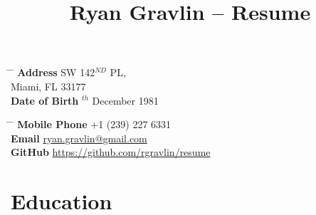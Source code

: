 \documentclass[10pt]{article} %
\begin{document}

\title{Ryan Gravlin -- Resume} %


\parbox{0.5\textwidth}{ %
\begin{tabbing} %
\hspace{3cm} \= \hspace{4cm} \= \kill %
{\bf Address}  SW 142$^{ND}$ PL,\\ %
\> Miami, FL 33177 \\ %
{\bf Date of Birth} $^{th}$ December 1981 \\ %
\end{tabbing}}
\hfill %
\parbox{0.5\textwidth}{ %
\begin{tabbing} %
\hspace{3cm} \= \hspace{4cm} \= \kill %
{\bf Mobile Phone} \> +1 (239) 227 6331 \\ %
{\bf Email} \> \href{mailto:ryan.gravlin@gmail.com}{ryan.gravlin@gmail.com} \\ %
{\bf GitHub} \> \href{https://github.com/rgravlin/resume}{https://github.com/rgravlin/resume} \\ %
\end{tabbing}}

\section{Education}


\end{document}
